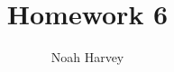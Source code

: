 \documentclass[a4paper,titlepage]{article}
\begin{document}
	\title{Homework 6}
	\author{Noah Harvey}
	\maketitle

	\pagebreak

	

\end{document}
